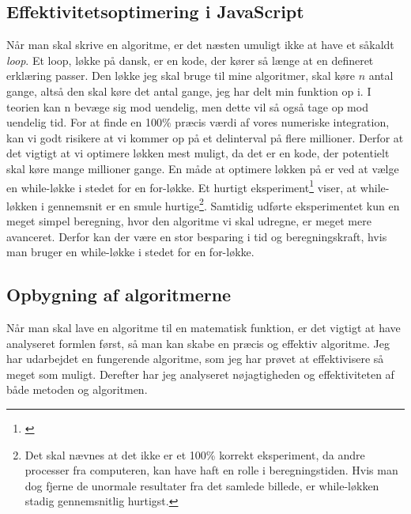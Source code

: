 \documentclass[12pt]{article}
\numberwithin{equation}{section}
\begin{document}
\subsection{Effektivitetsoptimering i JavaScript}
Når man skal skrive en algoritme, er det næsten umuligt ikke at have et såkaldt \emph{loop}. Et loop, løkke på dansk, er en kode, der kører så længe at en defineret erklæring passer. Den løkke jeg skal bruge til mine algoritmer, skal køre $n$ antal gange, altså den skal køre det antal gange, jeg har delt min funktion op i. I teorien kan n bevæge sig mod uendelig, men dette vil så også tage op mod uendelig tid. For at finde en 100\% præcis værdi af vores numeriske integration, kan vi godt risikere at vi kommer op på et delinterval på flere millioner. Derfor at det vigtigt at vi optimere løkken mest muligt, da det er en kode, der potentielt skal køre mange millioner gange. En måde at optimere løkken på er ved at vælge en while-løkke i stedet for en for-løkke. Et hurtigt eksperiment\footnote{\cite{forvswhile}} viser, at while-løkken i gennemsnit er en smule hurtige\footnote{Det skal nævnes at det ikke er et 100\% korrekt eksperiment, da andre processer fra computeren, kan have haft en rolle i beregningstiden. Hvis man dog fjerne de unormale resultater fra det samlede billede, er while-løkken stadig gennemsnitlig hurtigst.}. Samtidig udførte eksperimentet kun en meget simpel beregning, hvor den algoritme vi skal udregne, er meget mere avanceret. Derfor kan der være en stor besparing i tid og beregningskraft, hvis man bruger en while-løkke i stedet for en for-løkke.


\subsection{Opbygning af algoritmerne}
Når man skal lave en algoritme til en matematisk funktion, er det vigtigt at have analyseret formlen først, så man kan skabe en præcis og effektiv algoritme. Jeg har udarbejdet en fungerende algoritme, som jeg har prøvet at effektivisere så meget som muligt. Derefter har jeg analyseret nøjagtigheden og effektiviteten af både metoden og algoritmen.
\end{document}
